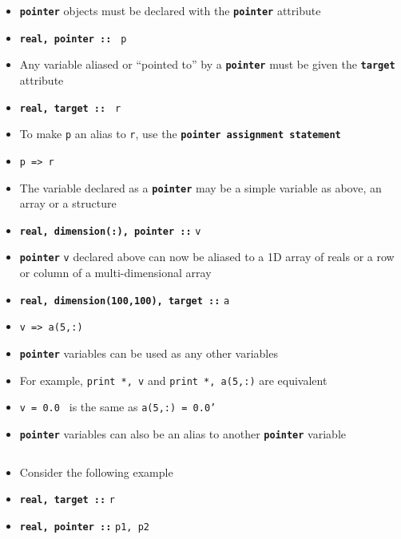 \documentclass[slidestop,mathserif,compress,xcolor=svgnames]{beamer}
\newcommand{\bftt}[1]{\textbf{\texttt{#1}}}
\newenvironment{bblock}[0]
{
\begin{beamerboxesrounded}[upper=uppercol1,lower=lowercol1,shadow=true]}
{\end{beamerboxesrounded}}
\begin{document}
\begin{frame}[allowframebreaks]
  \framebreak
  \begin{block}{}%
    \begin{itemize}
      \item \bftt{pointer} objects must be declared with the \bftt{pointer} attribute
      \item[] \bftt{real, pointer :: } \texttt{p}
      \item Any variable aliased or ``pointed to'' by a \bftt{pointer} must be given the \bftt{target} attribute
      \item[] \bftt{real, target :: } \texttt{r}
      \item To make \texttt{p} an alias to \texttt{r}, use the \bftt{pointer assignment statement}
      \item[] \texttt{p => r}
      \item The variable declared as a \bftt{pointer} may be a simple variable as above, an array or a structure
      \item[] \bftt{real, dimension(:), pointer ::} \texttt{v}
      \item \bftt{pointer} \texttt{v} declared above can now be aliased to a 1D array of reals or a row or column of a multi-dimensional array
      \item[] \bftt{real, dimension(100,100), target ::} \texttt{a}
      \item[] \texttt{v => a(5,:)}
      \item \bftt{pointer} variables can be used as any other variables
      \item[] For example, \texttt{print *, v} and \texttt{print *, a(5,:)} are equivalent
      \item[] \texttt{v = 0.0 } is the same as \texttt{a(5,:) = 0.0'}
    \end{itemize}
  \end{block}
  \begin{itemize}
    \item \bftt{pointer} variables can also be an alias to another \bftt{pointer} variable
  \end{itemize}
  \begin{columns}
    \column{5.5cm}
    \begin{bblock}{}
      \begin{itemize}
        \item Consider the following example
        \item[] \bftt{real, target ::} \texttt{r}
        \item[] \bftt{real, pointer ::} \texttt{p1, p2}

\end{itemize}
\end{bblock}
\end{columns}
\end{frame}
\end{document}
